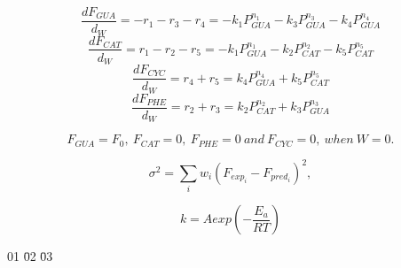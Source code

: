 \begin{center}


\begin{equation} \label{Eq22}
\frac{dF_{GUA}}{d_{W}}=-r_1-r_3-r_4=-k_1 P_{GUA}^{n_1}-k_3 P_{GUA}^{n_3}-k_4 P_{GUA}^{n_4}
\end{equation}
\begin{equation} \label{Eq23}
\frac{dF_{CAT}}{d_{W}}=r_1-r_2-r_5=-k_1 P_{GUA}^{n_1}-k_2 P_{CAT}^{n_2}-k_5 P_{CAT}^{n_5}
\end{equation}
\begin{equation} \label{Eq24}
\frac{dF_{CYC}}{d_{W}}=r_4+r_5=k_4 P_{GUA}^{n_4}+k_5 P_{CAT}^{n_5}
\end{equation}
\begin{equation} \label{Eq25}
\frac{dF_{PHE}}{d_{W}}=r_2+r_3=k_2 P_{CAT}^{n_2}+k_3 P_{GUA}^{n_3}
\end{equation}


\begin{equation} \label{Eq18}
F_{GUA}=F_0,~F_{CAT}=0,~F_{PHE}=0~and~F_{CYC}=0,~when~W=0.
\end{equation}

\begin{equation} \label{Eq19}
\sigma^2=\sum_{i}{w_i(F_{exp_i}-F_{pred_i})^2},
\end{equation}


\begin{equation} \label{Eq31}
k=Aexp\left(-\frac{E_a}{RT}\right)
\end{equation}


\begin{tabbing}

01\hspace*{50bp} \=02\hspace*{90bp} \=03\hspace*{50bp}\kill


\end{tabbing}
\end{center}
